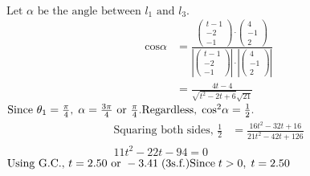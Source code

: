 \documentclass[12pt, a4 paper]{article}
\begin{document}
\begin{outline}[enumerate]
\begin{align*}
					\end{align*}
					${\textrm{Let }}\alpha {\textrm{ be the angle between }}{l_1}{\textrm{ and }}{l_3}.$
					\begin{align*}
						{\textrm{cos}}\alpha & = \frac{{\left( {\begin{array}{*{20}{c}}{t - 1} \\{ - 2}\\{ - 1}\end{array}} \right) \cdot \left( {\begin{array}{*{20}{c}}4\\{ - 1}\\2\end{array}} \right)}}{{\left| {\left( {\begin{array}{*{20}{c}}{t - 1}\\{ - 2}\\{ - 1}\end{array}} \right)} \right| \cdot \left| {\left( {\begin{array}{*{20}{c}}4\\{ - 1}\\2\end{array}} \right)} \right|}}\\ &= \frac{{4t - 4}}{{\sqrt {{t^2} - 2t + 6} \sqrt {21} }}
					\end{align*}
					$
					{\textrm{Since }}{\theta _1} = \frac{\pi }{4},\;\alpha  = \frac{{3\pi }}{4}{\textrm{ or }}\frac{\pi }{4}.\\
					{\textrm{Regardless}},\;{\cos ^2}\alpha  = \frac{1}{2}.$
					\begin{align*}
						{\textrm{Squaring both sides, }}\frac{1}{2} & = \frac{{16{t^2} - 32t + 16}}{{21{t^2} - 42t + 126}} \\11{t^2} - 22t - 94 = 0
					\end{align*}
					${\textrm{Using G}}{\textrm{.C}}{\textrm{., }}t = 2.50{\textrm{ or }} - 3.41\;({\textrm{3s}}{\textrm{.f}}{\textrm{.)}}\\
					{\textrm{Since}}\;t > 0,\;t = 2.50$
													

\end{outline}
\end{document}
